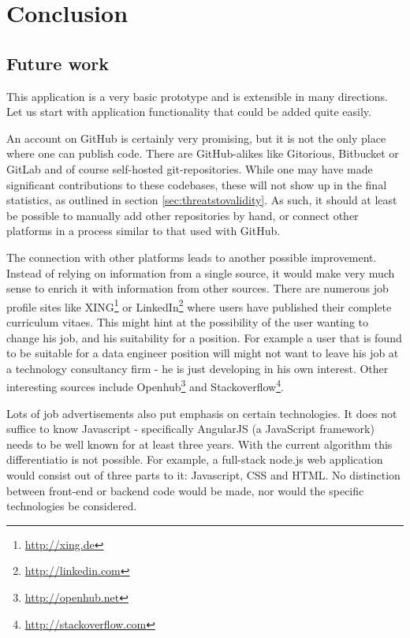 \chapter{Conclusion}\label{ch:conclusion}
\section{Future work}
This application is a very basic prototype and is extensible in many directions.
Let us start with application functionality that could be added quite easily.

An account on GitHub is certainly very promising, but it is not the only
place where one can publish code. There are GitHub-alikes like Gitorious,
Bitbucket or GitLab and of course self-hosted git-repositories.
While one may have made significant contributions to these codebases,
these will not show up in the final statistics, as outlined in
section \ref{sec:threatstovalidity}. As such, it should
at least be possible to manually add other repositories by
hand, or connect other platforms in a process similar
to that used with GitHub.

The connection with other platforms leads to another possible improvement.
Instead of relying on information from a single source, it would make very
much sense to enrich it with information from other sources. There
are numerous job profile sites like XING\footnote{\url{http://xing.de}}
or LinkedIn\footnote{\url{http://linkedin.com}} where users have
published their complete curriculum vitaes. This might hint at the
possibility of the user wanting to change his job, and his suitability for
a position. For example a user that is found to be suitable for a data engineer
position will might not want to leave his job at a technology consultancy
firm - he is just developing in his own interest.
Other interesting sources include Openhub\footnote{\url{http://openhub.net}}
and Stackoverflow\footnote{\url{http://stackoverflow.com}}.
\newline

Lots of job advertisements also put emphasis on certain technologies.
It does not suffice to know Javascript - specifically AngularJS (a JavaScript framework)
needs to be well known for at least three years.
With the current algorithm this differentiatio is not possible.
For example, a full-stack node.js web application would consist out of three
parts to it: Javascript, CSS and HTML. No distinction between front-end
or backend code would be made, nor would the specific technologies be considered.
\newline

